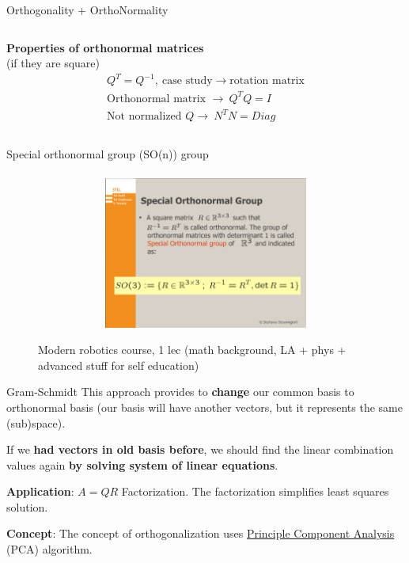 \documentclass[aspectratio=169]{beamer}
\begin{document}
\begin{frame}[t]{Orthogonality + OrthoNormality}
\begin{columns}[T,onlytextwidth]
\begin{column}{0.49\textwidth}
            \centering \textbf{Properties of orthonormal matrices} \\ {\centering (if they are square)}
            \begin{align*}
                Q^T=Q^{-1},\ \text{case study} \rightarrow \text{rotation matrix} \\
                \text{Orthonormal matrix }\rightarrow \ Q^TQ = I \\
                \text{Not normalized } Q \rightarrow \ N^TN = Diag
            \end{align*}
        \end{column}
    \end{columns}
\end{frame}

\begin{frame}[t]{Special orthonormal group (SO(n)) group}
    \framesubtitle{}
    \begin{figure}[H]
        \href{https://disk.yandex.ru/i/XD6o-ZIGS4yLvA}{\centering\includegraphics[height=5cm,width=1\textwidth,keepaspectratio]{course_modern.png}}
        \caption*{Modern robotics course, 1 lec (math background, LA + phys + advanced stuff for self education)}
        \label{fig:course_modern.png}
    \end{figure}
\end{frame}

\begin{frame}[t]{Gram-Schmidt}
    \vspace{-0.5cm}
    \Large
    This approach provides to \textbf{change} our \alert{common basis} to \alert{orthonormal basis} (our basis will have another vectors, but it represents the same (sub)space).

    If we \textbf{had vectors in old basis before}, we should find the linear combination values again \textbf{by solving system of linear equations}.

    \textbf{Application}: $A=QR$ Factorization. The factorization simplifies least squares solution.

    \textbf{Concept}: The concept of orthogonalization uses \href{https://en.wikipedia.org/wiki/Principal_component_analysis}{Principle Component Analysis} (PCA) algorithm. 

\end{frame}
\end{document}
